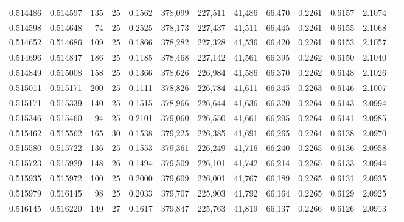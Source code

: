 \begin{tabular}{rrrrrrrrrrrrr}
0.514486 & 0.514597 &   135 &  25 &                                     0.1562 & 378,099 & 227,511 &  41,486 &  66,470 & 0.2261 & 0.6157 & 2.1074 \\
0.514598 & 0.514648 &    74 &  25 &                                     0.2525 & 378,173 & 227,437 &  41,511 &  66,445 & 0.2261 & 0.6155 & 2.1068 \\
0.514652 & 0.514686 &   109 &  25 &                                     0.1866 & 378,282 & 227,328 &  41,536 &  66,420 & 0.2261 & 0.6153 & 2.1057 \\
0.514696 & 0.514847 &   186 &  25 &                                     0.1185 & 378,468 & 227,142 &  41,561 &  66,395 & 0.2262 & 0.6150 & 2.1040 \\
0.514849 & 0.515008 &   158 &  25 &                                     0.1366 & 378,626 & 226,984 &  41,586 &  66,370 & 0.2262 & 0.6148 & 2.1026 \\
0.515011 & 0.515171 &   200 &  25 &                                     0.1111 & 378,826 & 226,784 &  41,611 &  66,345 & 0.2263 & 0.6146 & 2.1007 \\
0.515171 & 0.515339 &   140 &  25 &                                     0.1515 & 378,966 & 226,644 &  41,636 &  66,320 & 0.2264 & 0.6143 & 2.0994 \\
0.515346 & 0.515460 &    94 &  25 &                                     0.2101 & 379,060 & 226,550 &  41,661 &  66,295 & 0.2264 & 0.6141 & 2.0985 \\
0.515462 & 0.515562 &   165 &  30 &                                     0.1538 & 379,225 & 226,385 &  41,691 &  66,265 & 0.2264 & 0.6138 & 2.0970 \\
0.515580 & 0.515722 &   136 &  25 &                                     0.1553 & 379,361 & 226,249 &  41,716 &  66,240 & 0.2265 & 0.6136 & 2.0958 \\
0.515723 & 0.515929 &   148 &  26 &                                     0.1494 & 379,509 & 226,101 &  41,742 &  66,214 & 0.2265 & 0.6133 & 2.0944 \\
0.515935 & 0.515972 &   100 &  25 &                                     0.2000 & 379,609 & 226,001 &  41,767 &  66,189 & 0.2265 & 0.6131 & 2.0935 \\
0.515979 & 0.516145 &    98 &  25 &                                     0.2033 & 379,707 & 225,903 &  41,792 &  66,164 & 0.2265 & 0.6129 & 2.0925 \\
0.516145 & 0.516220 &   140 &  27 &                                     0.1617 & 379,847 & 225,763 &  41,819 &  66,137 & 0.2266 & 0.6126 & 2.0913 \\

\end{tabular}
